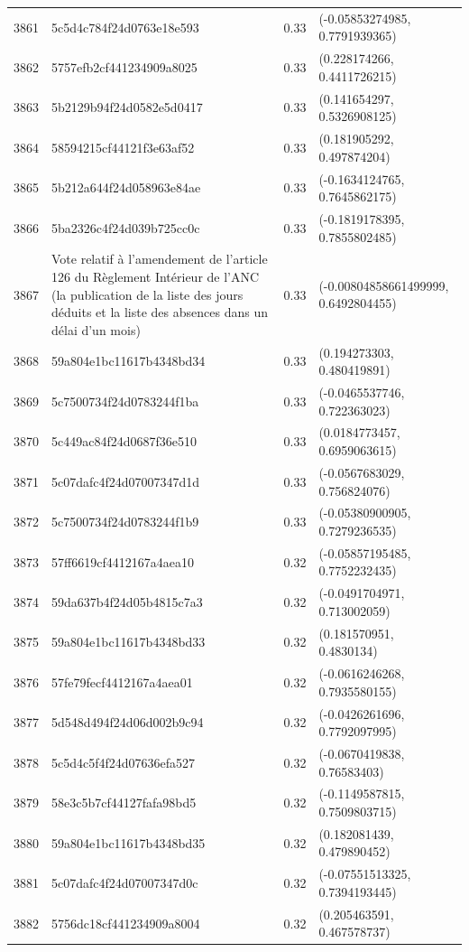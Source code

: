 \begin{table}[ht]
\begin{tabular}{rlrl}
  3861 & 5c5d4c784f24d0763e18e593 & 0.33 & (-0.05853274985, 0.7791939365) \\ 
  3862 & 5757efb2cf441234909a8025 & 0.33 & (0.228174266, 0.4411726215) \\ 
  3863 & 5b2129b94f24d0582e5d0417 & 0.33 & (0.141654297, 0.5326908125) \\ 
  3864 & 58594215cf44121f3e63af52 & 0.33 & (0.181905292, 0.497874204) \\ 
  3865 & 5b212a644f24d058963e84ae & 0.33 & (-0.1634124765, 0.7645862175) \\ 
  3866 & 5ba2326c4f24d039b725cc0c & 0.33 & (-0.1819178395, 0.7855802485) \\ 
  3867 & Vote relatif à l'amendement de l'article 126 du Règlement Intérieur de l'ANC (la publication de la liste des jours déduits et la liste des absences dans un délai d'un mois) & 0.33 & (-0.00804858661499999, 0.6492804455) \\ 
  3868 & 59a804e1bc11617b4348bd34 & 0.33 & (0.194273303, 0.480419891) \\ 
  3869 & 5c7500734f24d0783244f1ba & 0.33 & (-0.0465537746, 0.722363023) \\ 
  3870 & 5c449ac84f24d0687f36e510 & 0.33 & (0.0184773457, 0.6959063615) \\ 
  3871 & 5c07dafc4f24d07007347d1d & 0.33 & (-0.0567683029, 0.756824076) \\ 
  3872 & 5c7500734f24d0783244f1b9 & 0.33 & (-0.05380900905, 0.7279236535) \\ 
  3873 & 57ff6619cf4412167a4aea10 & 0.32 & (-0.05857195485, 0.7752232435) \\ 
  3874 & 59da637b4f24d05b4815c7a3 & 0.32 & (-0.0491704971, 0.713002059) \\ 
  3875 & 59a804e1bc11617b4348bd33 & 0.32 & (0.181570951, 0.4830134) \\ 
  3876 & 57fe79fecf4412167a4aea01 & 0.32 & (-0.0616246268, 0.7935580155) \\ 
  3877 & 5d548d494f24d06d002b9c94 & 0.32 & (-0.0426261696, 0.7792097995) \\ 
  3878 & 5c5d4c5f4f24d07636efa527 & 0.32 & (-0.0670419838, 0.76583403) \\ 
  3879 & 58e3c5b7cf44127fafa98bd5 & 0.32 & (-0.1149587815, 0.7509803715) \\ 
  3880 & 59a804e1bc11617b4348bd35 & 0.32 & (0.182081439, 0.479890452) \\ 
  3881 & 5c07dafc4f24d07007347d0c & 0.32 & (-0.07551513325, 0.7394193445) \\ 
  3882 & 5756dc18cf441234909a8004 & 0.32 & (0.205463591, 0.467578737) \\ 

\end{tabular}
\end{table}

